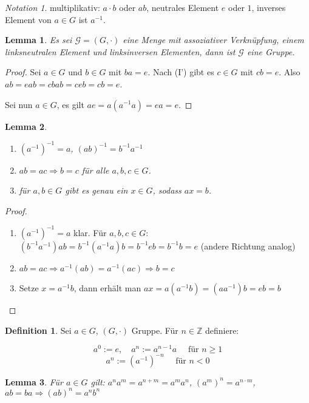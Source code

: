 \documentclass[12pt]{scrartcl}%
\newtheorem{lemma}{Lemma}
\theoremstyle{definition}
\newtheorem*{defn}{Definition}
\theoremstyle{remark}
\newtheorem*{notation}{Notation}
\newcommand{\implies}{\Rightarrow}
\newcommand{\inv}[1]{\left(#1\right)^{-1}}
\newcommand{\Inv}[1]{#1^{-1}}
\begin{document}
\begin{notation}
    multiplikativ: $a\cdot b$ oder $ab$, neutrales Element $e$ oder $1$, inverses Element von $a\in G$ ist $\Inv a$.
\end{notation}

\begin{lemma}
    Es sei $\mathcal{G}=(G,\cdot)$ eine Menge mit assoziativer Verknüpfung, einem linksneutralen Element und linksinversen Elementen, dann ist $\mathcal{G}$ eine Gruppe.
\end{lemma}

\begin{proof}
    Sei $a\in G$ und $b\in G$ mit $ba=e$. Nach (I') gibt es $c\in G$ mit $cb=e$. Also $ab=eab=cbab=ceb=cb=e$.

    Sei nun $a\in G$, es gilt $ae=a(\Inv aa)=ea=e$.
\end{proof}

\begin{lemma}
    \begin{enumerate}
        \item $\inv{\Inv{a}}=a$, $\inv{ab}=\Inv b\Inv a$
        \item $ab=ac \implies b=c$ für alle $a,b,c\in G$.
        \item für $a,b\in G$ gibt es genau ein $x\in G$, sodass $ax=b$.
    \end{enumerate}
\end{lemma}

\begin{proof}
    \begin{enumerate}
        \item $\inv{\Inv a}=a$ klar. Für $a,b,c\in G$: $(\Inv b\Inv a)ab=\Inv b(\Inv aa)b=\Inv beb=\Inv bb=e$ (andere Richtung analog)
        \item $ab=ac\implies \Inv a(ab)=\Inv a(ac)\implies b=c$
        \item Setze $x=\Inv ab$, dann erhält man $ax=a(\Inv ab)=(a\Inv a)b=eb=b$
    \end{enumerate}
\end{proof}

\begin{defn}
    Sei $a\in G$, $(G,\cdot)$ Gruppe. Für $n\in \mathbb{Z}$ definiere:
    
    $$a^0:=e, \quad a^n:=a^{n-1}a \quad \text{ für } n\geq 1$$
    $$a^n:=\left(\Inv a\right)^{-n} \quad \text{ für } n < 0$$
\end{defn}

\begin{lemma}
    Für $a\in G$ gilt: $a^n a^m=a^{n+m}=a^m a^n$, $\left(a^m \right)^n = a^{n\cdot m}$, $ab=ba \implies \left(ab \right)^n = a^n b^n$
\end{lemma}
\end{document}
